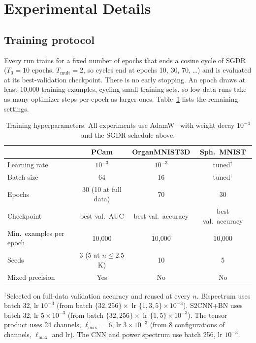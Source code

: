 \documentclass{article}
\theoremstyle{definition}
\theoremstyle{remark}
\theoremstyle{definition}
\begin{document}
\section{Experimental Details}
\label{app:exp}

\subsection{Training protocol}

Every run trains for a fixed number of epochs that ends a cosine cycle of
SGDR~\citep{loshchilov2017sgdr} ($T_0 = 10$ epochs, $T_{\mathrm{mult}} = 2$, so cycles end at
epochs 10, 30, 70, \dots) and is evaluated at its best-validation checkpoint. There is no early
stopping. An epoch draws at least 10{,}000 training examples, cycling small training sets, so
low-data runs take as many optimizer steps per epoch as larger ones. Table~\ref{tab:hyperparams}
lists the remaining settings.

\begin{table}[h]
  \caption{Training hyperparameters. All experiments use AdamW~\citep{loshchilov2019adamw}
    with weight decay $10^{-4}$ and the SGDR schedule above.}
  \label{tab:hyperparams}
  \centering
  \small
  \setlength{\tabcolsep}{4pt}
  \begin{tabular}{lccc}
    \toprule
    & PCam & OrganMNIST3D & Sph.\ MNIST \\
    \midrule
    Learning rate   & $10^{-3}$ & $10^{-3}$ & tuned$^\dagger$ \\
    Batch size      & 64 & 16 & tuned$^\dagger$ \\
    Epochs          & 30 (10 at full data) & 70 & 30 \\
    Checkpoint      & best val.\ AUC & best val.\ accuracy & best val.\ accuracy \\
    Min.\ examples per epoch & 10{,}000 & 10{,}000 & 10{,}000 \\
    Seeds           & 3 (5 at $n \le 2.5$K) & 10 & 5 \\
    Mixed precision & Yes & No & No \\
    \bottomrule
  \end{tabular}

  \vspace{0.3em}
  {\small $^\dagger$Selected on full-data validation accuracy and reused at every $n$.
    Bispectrum uses batch 32, lr $10^{-3}$ (from batch $\{32, 256\}\times$ lr
    $\{1, 3, 5\}\times 10^{-3}$). S2CNN+BN uses batch 32, lr $5\times 10^{-3}$ (from batch
    $\{32, 256\}\times$ lr $\{1, 5\}\times 10^{-3}$). The tensor product uses 24 channels,
    $\ell_{\max} = 6$, lr $3\times 10^{-3}$ (from 8 configurations of channels, $\ell_{\max}$
    and lr). The CNN and power spectrum use batch 256, lr $10^{-3}$.}
\end{table}
\end{document}
